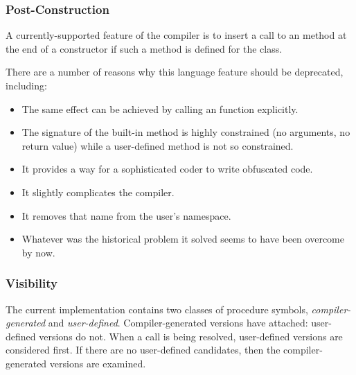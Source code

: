 \subsubsection{Post-Construction}

A currently-supported feature of the compiler is to insert a call to an 
method at the end of a constructor if such a method is defined for the class.

There are a number of reasons why this language feature should be deprecated, including:
\begin{itemize}
\item The same effect can be achieved by calling an  function explicitly.
\item The signature of the built-in  method is highly constrained (no
  arguments, no return value) while a user-defined  method is not so
  constrained. 
\item It provides a way for a sophisticated coder to write obfuscated code.
\item It slightly complicates the compiler.
\item It removes that name from the user's namespace.
\item Whatever was the historical problem it solved seems to have been overcome by now.
\end{itemize}

\subsubsection{Visibility}

The current implementation contains two classes of procedure symbols,
\emph{compiler-generated} and \emph{user-defined}.  Compiler-generated versions have
 attached: user-defined versions do not.  When a call is
being resolved, user-defined versions are considered first.  If there are no user-defined
candidates, then the compiler-generated versions are examined.

